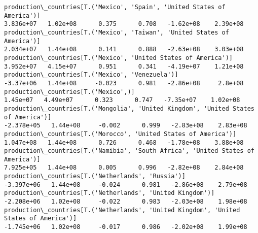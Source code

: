\documentclass[11pt]{article}
\begin{document}
\begin{Verbatim}[commandchars=\\\{\}]
production\_countries[T.('Mexico', 'Spain', 'United States of America')]                                                                                                                3.836e+07   1.02e+08      0.375      0.708   -1.62e+08    2.39e+08
production\_countries[T.('Mexico', 'Taiwan', 'United States of America')]                                                                                                               2.034e+07   1.44e+08      0.141      0.888   -2.63e+08    3.03e+08
production\_countries[T.('Mexico', 'United States of America')]                                                                                                                         3.952e+07   4.15e+07      0.951      0.341   -4.19e+07    1.21e+08
production\_countries[T.('Mexico', 'Venezuela')]                                                                                                                                        -3.37e+06   1.44e+08     -0.023      0.981   -2.86e+08     2.8e+08
production\_countries[T.('Mexico',)]                                                                                                                                                     1.45e+07   4.49e+07      0.323      0.747   -7.35e+07    1.02e+08
production\_countries[T.('Mongolia', 'United Kingdom', 'United States of America')]                                                                                                    -2.378e+05   1.44e+08     -0.002      0.999   -2.83e+08    2.83e+08
production\_countries[T.('Morocco', 'United States of America')]                                                                                                                        1.047e+08   1.44e+08      0.726      0.468   -1.78e+08    3.88e+08
production\_countries[T.('Namibia', 'South Africa', 'United States of America')]                                                                                                        7.925e+05   1.44e+08      0.005      0.996   -2.82e+08    2.84e+08
production\_countries[T.('Netherlands', 'Russia')]                                                                                                                                     -3.397e+06   1.44e+08     -0.024      0.981   -2.86e+08    2.79e+08
production\_countries[T.('Netherlands', 'United Kingdom')]                                                                                                                             -2.208e+06   1.02e+08     -0.022      0.983   -2.03e+08    1.98e+08
production\_countries[T.('Netherlands', 'United Kingdom', 'United States of America')]                                                                                                 -1.745e+06   1.02e+08     -0.017      0.986   -2.02e+08    1.99e+08

\end{Verbatim}
\end{document}
